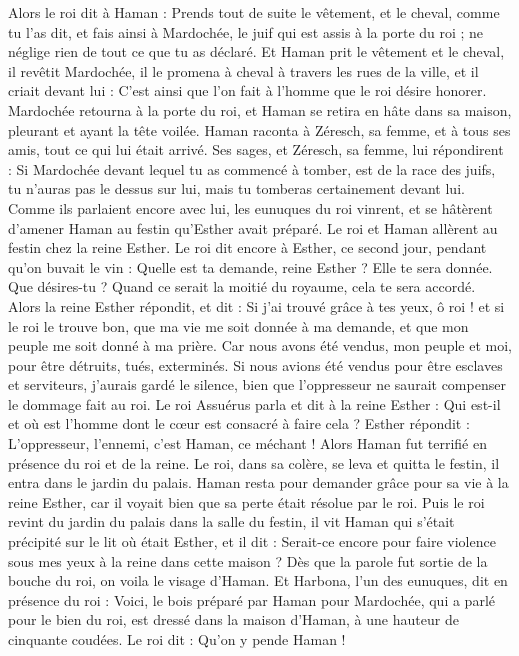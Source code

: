 \begin{multicols}{2}
Alors le roi dit à Haman : Prends tout de suite le vêtement, et le cheval, comme tu l'as dit, et fais ainsi à Mardochée, le juif qui est assis à la porte du roi ; ne néglige rien de tout ce que tu as déclaré.
Et Haman prit le vêtement et le cheval, il revêtit Mardochée, il le promena à cheval à travers les rues de la ville, et il criait devant lui : C'est ainsi que l’on fait à l'homme que le roi désire honorer.
Mardochée retourna à la porte du roi, et Haman se retira en hâte dans sa maison, pleurant et ayant la tête voilée.
Haman raconta à Zéresch, sa femme, et à tous ses amis, tout ce qui lui était arrivé. Ses sages, et Zéresch, sa femme, lui répondirent : Si Mardochée devant lequel tu as commencé à tomber, est de la race des juifs, tu n'auras pas le dessus sur lui, mais tu tomberas certainement devant lui.
Comme ils parlaient encore avec lui, les eunuques du roi vinrent, et se hâtèrent d'amener Haman au festin qu'Esther avait préparé.
\VerseOne{}Le roi et Haman allèrent au festin chez la reine Esther.
Le roi dit encore à Esther, ce second jour, pendant qu’on buvait le vin : Quelle est ta demande, reine Esther ? Elle te sera donnée. Que désires-tu ? Quand ce serait la moitié du royaume, cela te sera accordé.
Alors la reine Esther répondit, et dit : Si j'ai trouvé grâce à tes yeux, ô roi ! et si le roi le trouve bon, que ma vie me soit donnée à ma demande, et que mon peuple me soit donné à ma prière.
Car nous avons été vendus, mon peuple et moi, pour être détruits, tués, exterminés. Si nous avions été vendus pour être esclaves et serviteurs, j’aurais gardé le silence, bien que l'oppresseur ne saurait compenser le dommage fait au roi.
Le roi Assuérus parla et dit à la reine Esther : Qui est-il et où est l’homme dont le cœur est consacré à faire cela ?
Esther répondit : L'oppresseur, l'ennemi, c’est Haman, ce méchant ! Alors Haman fut terrifié en présence du roi et de la reine.
Le roi, dans sa colère, se leva et quitta le festin, il entra dans le jardin du palais. Haman resta pour demander grâce pour sa vie à la reine Esther, car il voyait bien que sa perte était résolue par le roi.
Puis le roi revint du jardin du palais dans la salle du festin, il vit Haman qui s’était précipité sur le lit où était Esther, et il dit : Serait-ce encore pour faire violence sous mes yeux à la reine dans cette maison ? Dès que la parole fut sortie de la bouche du roi, on voila le visage d'Haman.
Et Harbona, l'un des eunuques, dit en présence du roi : Voici, le bois préparé par Haman pour Mardochée, qui a parlé pour le bien du roi, est dressé dans la maison d'Haman, à une hauteur de cinquante coudées. Le roi dit : Qu’on y pende Haman !

\end{multicols}
